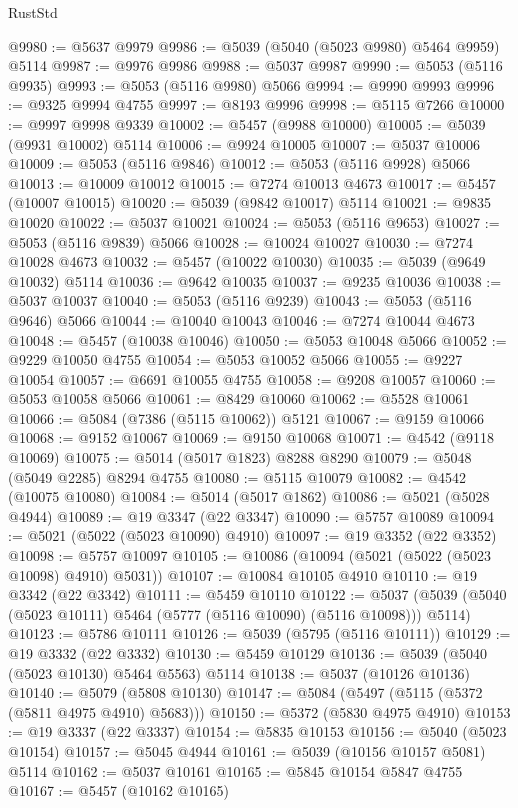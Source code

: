 \begin{lexlean}{RustStd}
\begin{coremodule}
@9980 := @5637 @9979
@9986 := @5039 (@5040 (@5023 @9980) @5464 @9959) @5114
@9987 := @9976 @9986
@9988 := @5037 @9987
@9990 := @5053 (@5116 @9935)
@9993 := @5053 (@5116 @9980) @5066
@9994 := @9990 @9993
@9996 := @9325 @9994 @4755
@9997 := @8193 @9996
@9998 := @5115 @7266
@10000 := @9997 @9998 @9339
@10002 := @5457 (@9988 @10000)
@10005 := @5039 (@9931 @10002) @5114
@10006 := @9924 @10005
@10007 := @5037 @10006
@10009 := @5053 (@5116 @9846)
@10012 := @5053 (@5116 @9928) @5066
@10013 := @10009 @10012
@10015 := @7274 @10013 @4673
@10017 := @5457 (@10007 @10015)
@10020 := @5039 (@9842 @10017) @5114
@10021 := @9835 @10020
@10022 := @5037 @10021
@10024 := @5053 (@5116 @9653)
@10027 := @5053 (@5116 @9839) @5066
@10028 := @10024 @10027
@10030 := @7274 @10028 @4673
@10032 := @5457 (@10022 @10030)
@10035 := @5039 (@9649 @10032) @5114
@10036 := @9642 @10035
@10037 := @9235 @10036
@10038 := @5037 @10037
@10040 := @5053 (@5116 @9239)
@10043 := @5053 (@5116 @9646) @5066
@10044 := @10040 @10043
@10046 := @7274 @10044 @4673
@10048 := @5457 (@10038 @10046)
@10050 := @5053 @10048 @5066
@10052 := @9229 @10050 @4755
@10054 := @5053 @10052 @5066
@10055 := @9227 @10054
@10057 := @6691 @10055 @4755
@10058 := @9208 @10057
@10060 := @5053 @10058 @5066
@10061 := @8429 @10060
@10062 := @5528 @10061
@10066 := @5084 (@7386 (@5115 @10062)) @5121
@10067 := @9159 @10066
@10068 := @9152 @10067
@10069 := @9150 @10068
@10071 := @4542 (@9118 @10069)
@10075 := @5014 (@5017 @1823) @8288 @8290
@10079 := @5048 (@5049 @2285) @8294 @4755
@10080 := @5115 @10079
@10082 := @4542 (@10075 @10080)
@10084 := @5014 (@5017 @1862)
@10086 := @5021 (@5028 @4944)
@10089 := @19 @3347 (@22 @3347)
@10090 := @5757 @10089
@10094 := @5021 (@5022 (@5023 @10090) @4910)
@10097 := @19 @3352 (@22 @3352)
@10098 := @5757 @10097
@10105 := @10086 (@10094 (@5021 (@5022 (@5023 @10098) @4910) @5031))
@10107 := @10084 @10105 @4910
@10110 := @19 @3342 (@22 @3342)
@10111 := @5459 @10110
@10122 := @5037 (@5039 (@5040 (@5023 @10111) @5464 (@5777 (@5116 @10090) (@5116 @10098))) @5114)
@10123 := @5786 @10111
@10126 := @5039 (@5795 (@5116 @10111))
@10129 := @19 @3332 (@22 @3332)
@10130 := @5459 @10129
@10136 := @5039 (@5040 (@5023 @10130) @5464 @5563) @5114
@10138 := @5037 (@10126 @10136)
@10140 := @5079 (@5808 @10130)
@10147 := @5084 (@5497 (@5115 (@5372 (@5811 @4975 @4910) @5683)))
@10150 := @5372 (@5830 @4975 @4910)
@10153 := @19 @3337 (@22 @3337)
@10154 := @5835 @10153
@10156 := @5040 (@5023 @10154)
@10157 := @5045 @4944
@10161 := @5039 (@10156 @10157 @5081) @5114
@10162 := @5037 @10161
@10165 := @5845 @10154 @5847 @4755
@10167 := @5457 (@10162 @10165)

\end{coremodule}
\end{lexlean}
